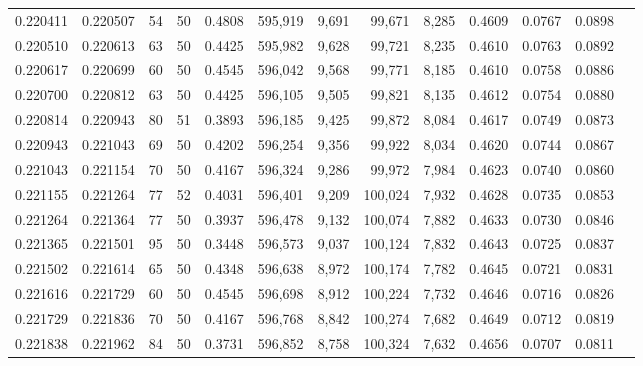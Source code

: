 \begin{tabular}{rrrrrrrrrrrrr}
0.220411 & 0.220507 &    54 &  50 &                                     0.4808 & 595,919 &   9,691 &  99,671 &   8,285 & 0.4609 & 0.0767 & 0.0898 \\
0.220510 & 0.220613 &    63 &  50 &                                     0.4425 & 595,982 &   9,628 &  99,721 &   8,235 & 0.4610 & 0.0763 & 0.0892 \\
0.220617 & 0.220699 &    60 &  50 &                                     0.4545 & 596,042 &   9,568 &  99,771 &   8,185 & 0.4610 & 0.0758 & 0.0886 \\
0.220700 & 0.220812 &    63 &  50 &                                     0.4425 & 596,105 &   9,505 &  99,821 &   8,135 & 0.4612 & 0.0754 & 0.0880 \\
0.220814 & 0.220943 &    80 &  51 &                                     0.3893 & 596,185 &   9,425 &  99,872 &   8,084 & 0.4617 & 0.0749 & 0.0873 \\
0.220943 & 0.221043 &    69 &  50 &                                     0.4202 & 596,254 &   9,356 &  99,922 &   8,034 & 0.4620 & 0.0744 & 0.0867 \\
0.221043 & 0.221154 &    70 &  50 &                                     0.4167 & 596,324 &   9,286 &  99,972 &   7,984 & 0.4623 & 0.0740 & 0.0860 \\
0.221155 & 0.221264 &    77 &  52 &                                     0.4031 & 596,401 &   9,209 & 100,024 &   7,932 & 0.4628 & 0.0735 & 0.0853 \\
0.221264 & 0.221364 &    77 &  50 &                                     0.3937 & 596,478 &   9,132 & 100,074 &   7,882 & 0.4633 & 0.0730 & 0.0846 \\
0.221365 & 0.221501 &    95 &  50 &                                     0.3448 & 596,573 &   9,037 & 100,124 &   7,832 & 0.4643 & 0.0725 & 0.0837 \\
0.221502 & 0.221614 &    65 &  50 &                                     0.4348 & 596,638 &   8,972 & 100,174 &   7,782 & 0.4645 & 0.0721 & 0.0831 \\
0.221616 & 0.221729 &    60 &  50 &                                     0.4545 & 596,698 &   8,912 & 100,224 &   7,732 & 0.4646 & 0.0716 & 0.0826 \\
0.221729 & 0.221836 &    70 &  50 &                                     0.4167 & 596,768 &   8,842 & 100,274 &   7,682 & 0.4649 & 0.0712 & 0.0819 \\
0.221838 & 0.221962 &    84 &  50 &                                     0.3731 & 596,852 &   8,758 & 100,324 &   7,632 & 0.4656 & 0.0707 & 0.0811 \\

\end{tabular}
